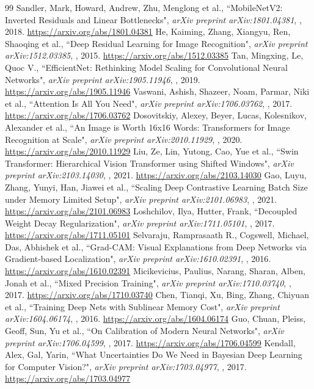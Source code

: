 \begin{thebibliography}{99}
 Sandler, Mark, Howard, Andrew, Zhu, Menglong et al., ``MobileNetV2: Inverted Residuals and Linear Bottlenecks", \emph{arXiv preprint arXiv:1801.04381}, , 2018. \url{https://arxiv.org/abs/1801.04381}
 He, Kaiming, Zhang, Xiangyu, Ren, Shaoqing et al., ``Deep Residual Learning for Image Recognition", \emph{arXiv preprint arXiv:1512.03385}, , 2015. \url{https://arxiv.org/abs/1512.03385}
 Tan, Mingxing, Le, Quoc V., ``EfficientNet: Rethinking Model Scaling for Convolutional Neural Networks", \emph{arXiv preprint arXiv:1905.11946}, , 2019. \url{https://arxiv.org/abs/1905.11946}
 Vaswani, Ashish, Shazeer, Noam, Parmar, Niki et al., ``Attention Is All You Need", \emph{arXiv preprint arXiv:1706.03762}, , 2017. \url{https://arxiv.org/abs/1706.03762}
 Dosovitskiy, Alexey, Beyer, Lucas, Kolesnikov, Alexander et al., ``An Image is Worth 16x16 Words: Transformers for Image Recognition at Scale", \emph{arXiv preprint arXiv:2010.11929}, , 2020. \url{https://arxiv.org/abs/2010.11929}
 Liu, Ze, Lin, Yutong, Cao, Yue et al., ``Swin Transformer: Hierarchical Vision Transformer using Shifted Windows", \emph{arXiv preprint arXiv:2103.14030}, , 2021. \url{https://arxiv.org/abs/2103.14030}
 Gao, Luyu, Zhang, Yunyi, Han, Jiawei et al., ``Scaling Deep Contrastive Learning Batch Size under Memory Limited Setup", \emph{arXiv preprint arXiv:2101.06983}, , 2021. \url{https://arxiv.org/abs/2101.06983}
 Loshchilov, Ilya, Hutter, Frank, ``Decoupled Weight Decay Regularization", \emph{arXiv preprint arXiv:1711.05101}, , 2017. \url{https://arxiv.org/abs/1711.05101}
 Selvaraju, Ramprasaath R., Cogswell, Michael, Das, Abhishek et al., ``Grad-CAM: Visual Explanations from Deep Networks via Gradient-based Localization", \emph{arXiv preprint arXiv:1610.02391}, , 2016. \url{https://arxiv.org/abs/1610.02391}
 Micikevicius, Paulius, Narang, Sharan, Alben, Jonah et al., ``Mixed Precision Training", \emph{arXiv preprint arXiv:1710.03740}, , 2017. \url{https://arxiv.org/abs/1710.03740}
 Chen, Tianqi, Xu, Bing, Zhang, Chiyuan et al., ``Training Deep Nets with Sublinear Memory Cost", \emph{arXiv preprint arXiv:1604.06174}, , 2016. \url{https://arxiv.org/abs/1604.06174}
 Guo, Chuan, Pleiss, Geoff, Sun, Yu et al., ``On Calibration of Modern Neural Networks", \emph{arXiv preprint arXiv:1706.04599}, , 2017. \url{https://arxiv.org/abs/1706.04599}
 Kendall, Alex, Gal, Yarin, ``What Uncertainties Do We Need in Bayesian Deep Learning for Computer Vision?", \emph{arXiv preprint arXiv:1703.04977}, , 2017. \url{https://arxiv.org/abs/1703.04977}

\end{thebibliography}
